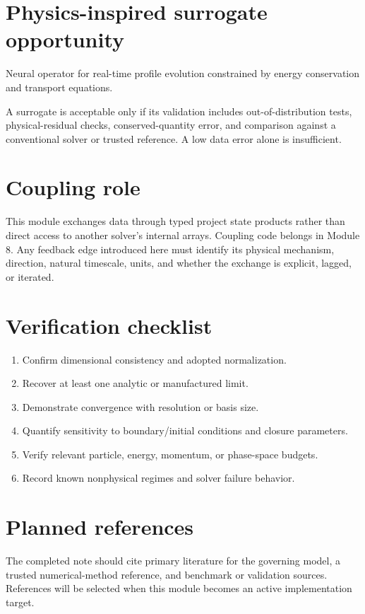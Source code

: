 \documentclass[11pt]{article}
\begin{document}
\section{Physics-inspired surrogate opportunity}
Neural operator for real-time profile evolution constrained by energy conservation and transport equations.

A surrogate is acceptable only if its validation includes out-of-distribution tests, physical-residual checks, conserved-quantity error, and comparison against a conventional solver or trusted reference. A low data error alone is insufficient.

\section{Coupling role}
This module exchanges data through typed project state products rather than direct access to another solver's internal arrays. Coupling code belongs in Module 8. Any feedback edge introduced here must identify its physical mechanism, direction, natural timescale, units, and whether the exchange is explicit, lagged, or iterated.

\section{Verification checklist}
\begin{enumerate}[leftmargin=1.6em]
\item Confirm dimensional consistency and adopted normalization.
\item Recover at least one analytic or manufactured limit.
\item Demonstrate convergence with resolution or basis size.
\item Quantify sensitivity to boundary/initial conditions and closure parameters.
\item Verify relevant particle, energy, momentum, or phase-space budgets.
\item Record known nonphysical regimes and solver failure behavior.
\end{enumerate}

\section{Planned references}
The completed note should cite primary literature for the governing model, a trusted numerical-method reference, and benchmark or validation sources. References will be selected when this module becomes an active implementation target.
\end{document}
